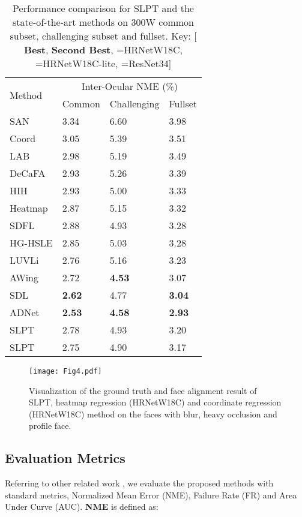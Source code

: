 \documentclass[10pt,twocolumn,letterpaper]{article}
\begin{document}
\begin{table}[t!]
	\begin{tabular}{m{2.2cm}<{\centering}|m{1.2cm}<{\centering}m{1.6cm}<{\centering}m{1.2cm}<{\centering}}
		\hline
		\multirow{2}{*}{Method} &  \multicolumn{3}{c}{Inter-Ocular NME (\%) } \\
		&  Common & Challenging & Fullset \\ \hline
		SAN \cite{SAN} &  3.34 & 6.60 & 3.98 \\
		Coord \cite{HRnet} &  3.05 & 5.39 & 3.51 \\ 
		LAB \cite{LAB} &  2.98 & 5.19 & 3.49 \\
		DeCaFA \cite{DeCaFA} &  2.93 & 5.26 & 3.39 \\
		HIH \cite{HIH} & 2.93 & 5.00 & 3.33  \\
		Heatmap \cite{HRnet} & 2.87 & 5.15 & 3.32 \\
		SDFL \cite{SCDF} & 2.88 & 4.93 & 3.28 \\
		HG-HSLE \cite{HLSE} & 2.85 & 5.03 & 3.28 \\
		LUVLi \cite{LUVLI} & 2.76 & 5.16 & 3.23 \\
		AWing \cite{Awing} & 2.72 & {\color{red} \textbf{4.53}} & 3.07 \\ 
		SDL \cite{SDL} & {\color{blue} \textbf{2.62}} & 4.77 & {\color{blue} \textbf{3.04}} \\ 
		ADNet \cite{ADNet} & {\color{red} \textbf{2.53}} & {\color{blue} \textbf{4.58}} & {\color{red} \textbf{2.93}} \\ \hline
		SLPT & 2.78 & 4.93& 3.20 \\
		SLPT & 2.75 & 4.90 & 3.17 \\ \hline
	\end{tabular}
	\caption{Performance comparison for SLPT and the state-of-the-art methods on 300W common subset, challenging subset and fullset. Key: [{\color{red} \textbf{Best}}, {\color{blue} \textbf{Second Best}}, =HRNetW18C, =HRNetW18C-lite, =ResNet34]}
	\label{Tabal2}
\end{table}
\begin{figure}[t!]
	\centering
	\texttt{[image: Fig4.pdf]}
	\caption{Visualization of the ground truth and face alignment result of SLPT, heatmap regression (HRNetW18C) and coordinate regression (HRNetW18C) method on the faces with blur, heavy occlusion and profile face.}
	\label{fig4}
\end{figure}

\subsection{Evaluation Metrics}
Referring to other related work \cite{LUVLI, Awing, SCDF}, we evaluate the proposed methods with standard metrics, Normalized Mean Error (NME), Failure Rate (FR) and Area Under Curve (AUC). \textbf{NME} is defined as:
\end{document}
